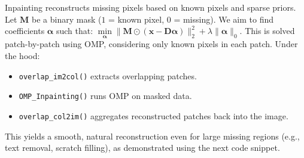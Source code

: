 \documentclass[11pt]{article}
\providecommand{\tightlist}{%
      \setlength{\itemsep}{0pt}\setlength{\parskip}{0pt}}
\begin{document}
Inpainting reconstructs missing pixels based on known pixels and sparse
priors. Let \(\mathbf{M}\) be a binary mask (\(1\) = known pixel, \(0\)
= missing). We aim to find coefficients \(\boldsymbol{\alpha}\) such
that:
\(\underset{\boldsymbol{\alpha}}{\min} \| \mathbf{M} \odot (\mathbf{x} - \mathbf{D}\boldsymbol{\alpha}) \|_2^2 + \lambda \|\boldsymbol{\alpha}\|_0\).
This is solved patch-by-patch using OMP, considering only known pixels
in each patch. Under the hood:

\begin{itemize}
\tightlist
\item
  \texttt{overlap\_im2col()} extracts overlapping patches.
\item
  \texttt{OMP\_Inpainting()} runs OMP on masked data.
\item
  \texttt{overlap\_col2im()} aggregates reconstructed patches back into
  the image.
\end{itemize}

This yields a smooth, natural reconstruction even for large missing
regions (e.g., text removal, scratch filling), as demonstrated using the
next code snippet.
\end{document}
